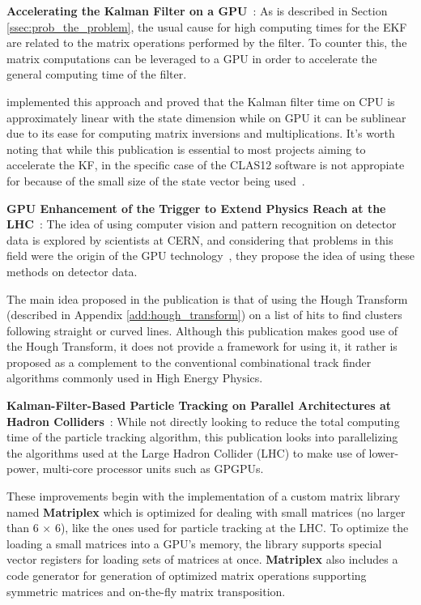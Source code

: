 \textbf{Accelerating the Kalman Filter on a GPU}~\cite{huang2011accelerating}: As is described in Section \ref{ssec:prob_the_problem}, the usual cause for high computing times for the EKF are related to the matrix operations performed by the filter.
To counter this, the matrix computations can be leveraged to a GPU in order to accelerate the general computing time of the filter.

\cite{huang2011accelerating} implemented this approach and proved that the Kalman filter time on CPU is approximately linear with the state dimension while on GPU it can be sublinear due to its ease for computing matrix inversions and multiplications.
It's worth noting that while this publication is essential to most projects aiming to accelerate the KF, in the specific case of the CLAS12 software is not appropiate for because of the small size of the state vector being used~\cite{moravanszky2003dense}.

\textbf{GPU Enhancement of the Trigger to Extend Physics Reach at the LHC}~\cite{halyo2013gpu}: The idea of using computer vision and pattern recognition on detector data is explored by scientists at CERN, and considering that problems in this field were the origin of the GPU technology~\cite{pharr2005gpu}, they propose the idea of using these methods on detector data.

The main idea proposed in the publication is that of using the Hough Transform (described in Appendix \ref{add:hough_transform}) on a list of hits to find clusters following straight or curved lines.
Although this publication makes good use of the Hough Transform, it does not provide a framework for using it, it rather is proposed as a complement to the conventional combinational track finder algorithms commonly used in High Energy Physics.

\textbf{Kalman-Filter-Based Particle Tracking on Parallel Architectures at Hadron Colliders}~\cite{cerati2016kalman}: While not directly looking to reduce the total computing time of the particle tracking algorithm, this publication looks into parallelizing the algorithms used at the Large Hadron Collider (LHC) to make use of lower-power, multi-core processor units such as GPGPUs.

These improvements begin with the implementation of a custom matrix library named \textbf{Matriplex} which is optimized for dealing with small matrices (no larger than $6\,\times\,6$), like the ones used for particle tracking at the LHC.
To optimize the loading a small matrices into a GPU's memory, the library supports special vector registers for loading sets of matrices at once.
\textbf{Matriplex} also includes a code generator for generation of optimized matrix operations supporting symmetric matrices and on-the-fly matrix transposition.

